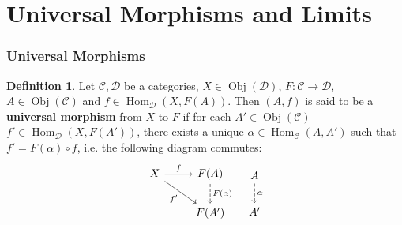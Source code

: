 \documentclass[12pt]{amsart}
\theoremstyle{definition}
\newtheorem{defn}[definition]{Definition}
\newcommand{\al}{\alpha}
\newcommand{\MC}{\mathcal{C}}
\newcommand{\MD}{\mathcal{D}}
\DeclareMathOperator{\Obj}{Obj}
\DeclareMathOperator{\Hom}{Hom}
\DeclareMathOperator*{\0}{\mbf{0}}
\DeclareMathOperator*{\1}{\mbf{1}}
\begin{document}
	
	
	
	
	
	
	
	
	
	
	
	
	
	
	
	
	
	
	
	
	
	
	
	
	
	
	
	
	
	
	
	
	
	
	
	
	
	
	
	
	
	
	
	
	
	
	
	
	
	
	\newpage
	\section{Universal Morphisms and Limits}
	
	\subsubsection{Universal Morphisms}

	\begin{defn}
		Let $\MC, \MD$ be a categories, $X \in \Obj(\MD)$, $F: \MC \rightarrow \MD$, $A \in \Obj(\MC)$ and $f \in \Hom_{\MD}(X, F(A))$. Then $(A, f)$ is said to be a \textbf{universal morphism} from $X$ to $F$ if for each $A' \in \Obj(\MC)$ $f' \in \Hom_{\MD}(X, F(A'))$, there exists a unique $\al \in \Hom_{\MC}(A, A')$ such that $f' = F(\al) \circ f$, i.e. the following diagram commutes:
		\[
		\begin{tikzcd}
			X \arrow[r, "f"]  \arrow[dr, "f'"'] & F(A) \arrow[d, "F(\al)", dashed] \\
			                                    & F(A')  
		\end{tikzcd}
		\hspace{.3cm}
		\begin{tikzcd}
			A  \arrow[d, "\al", dashed] \\
			A'  
		\end{tikzcd}
		\]
	\end{defn}
\end{document}
